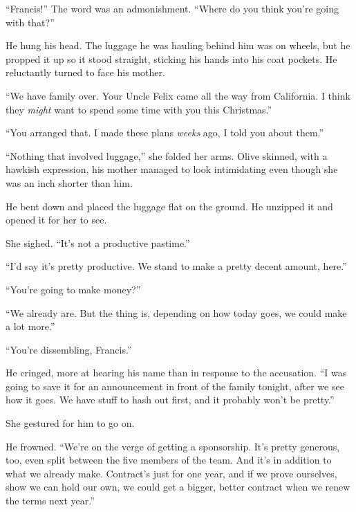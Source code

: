 





``Francis!'' The word was an admonishment.  ``Where do you think you're going with that?''



He hung his head.  The luggage he was hauling behind him was on wheels, but he propped it up so it stood straight, sticking his hands into his coat pockets.  He reluctantly turned to face his mother.



``We have family over.  Your Uncle Felix came all the way from California.  I think they \emph{might} want to spend some time with you this Christmas.''



``You arranged that.  I made these plans \emph{weeks} ago, I told you about them.''



``Nothing that involved luggage,'' she folded her arms.  Olive skinned, with a hawkish expression, his mother managed to look intimidating even though she was an inch shorter than him.



He bent down and placed the luggage flat on the ground.  He unzipped it and opened it for her to see.



She sighed.  ``It's not a productive pastime.''



``I'd say it's pretty productive.  We stand to make a pretty decent amount, here.''



``You're going to make money?''



``We already are.  But the thing is, depending on how today goes, we could make a lot more.''



``You're dissembling, Francis.''



He cringed, more at hearing his name than in response to the accusation.  ``I was going to save it for an announcement in front of the family tonight, after we see how it goes.  We have stuff to hash out first, and it probably won't be pretty.''



She gestured for him to go on.



He frowned.  ``We're on the verge of getting a sponsorship. It's pretty generous, too, even split between the five members of the team.  And it's in addition to what we already make.  Contract's just for one year, and if we prove ourselves, show we can hold our own, we could get a bigger, better contract when we renew the terms next year.''



